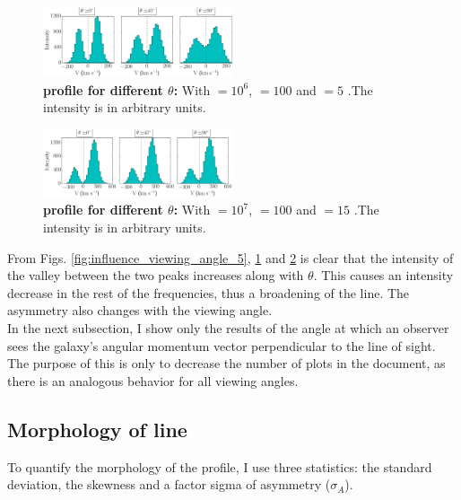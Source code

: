\documentclass{latex/emulateapj}
\begin{document}
\begin{figure}[h!]
	\begin{center}
		\includegraphics[width=0.5\textwidth]{./figures/influence_viewing_angle_6}
	\end{center}
	\caption{\textbf{\lya profile for different $\theta$:} With \tauh$=10^6$, \vrot$=100$ \kms and \vout$=5$ \kms.The intensity is in arbitrary units.
		\label{fig:influence_viewing_angle_6}}
\end{figure}

\begin{figure}[h!]
	\begin{center}
		\includegraphics[width=0.5\textwidth]{./figures/influence_viewing_angle_7}
	\end{center}
	\caption{\textbf{\lya profile for different $\theta$:} With \tauh$=10^7$, \vrot$=100$ \kms and \vout$=15$ \kms.The intensity is in arbitrary units.
		\label{fig:influence_viewing_angle_7}}
\end{figure}

From Figs. \ref{fig:influence_viewing_angle_5}, \ref{fig:influence_viewing_angle_6} and \ref{fig:influence_viewing_angle_7} is clear that the intensity of the valley between the two peaks increases along with $\theta$. This causes an intensity decrease in the rest of the frequencies, thus a broadening of the line. The asymmetry also changes with the viewing angle.\\

In the next subsection, I show only the results of the angle at which an observer sees the galaxy's angular momentum vector perpendicular to the line of sight. The purpose of this is only to decrease the number of plots in the document, as there is an analogous behavior for all viewing angles. \\

\subsection{Morphology of \lya line}
To quantify the morphology of the \lya profile, I use three statistics: the standard deviation, the skewness and a factor sigma of asymmetry ($\sigma_A$). \\
\end{document}
